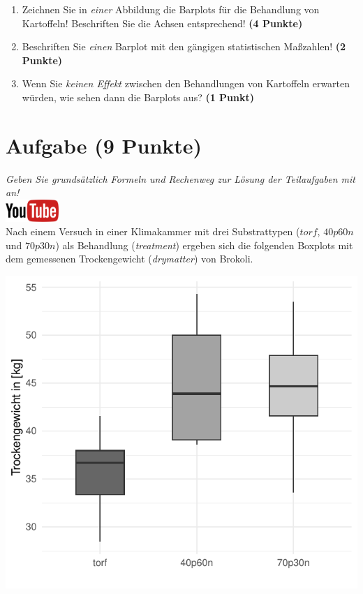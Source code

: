 \documentclass[a4paper, 9pt]{scrartcl}\usepackage[]{graphicx}\usepackage[]{xcolor}
\makeatletter
\def\maxwidth{ %
  \ifdim\Gin@nat@width>\linewidth
    \linewidth
  \else
    \Gin@nat@width
  \fi
}
\makeatother
\begin{document}
\begin{enumerate}
\item Zeichnen Sie in \textit{einer} Abbildung die Barplots f{\"u}r die
  Behandlung von Kartoffeln! Beschriften Sie die Achsen entsprechend!
  \textbf{(4 Punkte)}
\item Beschriften Sie \textit{einen} Barplot mit den g{\"a}ngigen
  statistischen Ma{\ss}zahlen! \textbf{(2 Punkte)}
\item Wenn Sie \textit{keinen Effekt} zwischen den Behandlungen von
  Kartoffeln erwarten w{\"u}rden, wie sehen dann die Barplots aus?
  \textbf{(1 Punkt)}
\end{enumerate} 
\clearpage

\section{Aufgabe \hfill (9 Punkte)}

\textit{Geben Sie grunds{\"a}tzlich Formeln und Rechenweg zur L{\"o}sung der
  Teilaufgaben mit an!} \\[1Ex]

\hfill\href{https://youtu.be/Xf0yE-o7bEU}{\includegraphics[width = 2cm]{img/youtube}}\\[1Ex] %



Nach einem Versuch in einer Klimakammer mit drei Substrattypen ($torf$, $40p60n$ und $70p30n$) als Behandlung
(\textit{treatment}) ergeben sich die folgenden Boxplots mit dem
gemessenen Trockengewicht (\textit{drymatter}) von Brokoli.



{\centering \includegraphics[width=\maxwidth]{img/boxplot-02-zer-1} 

}
\end{document}
